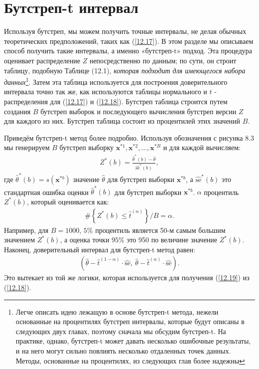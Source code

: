 \section{Бутстреп-t интервал}
Используя бутстреп, мы можем получить точные интервалы, не делая обычных теоретических предположений, таких как (\ref{12.17}). В этом разделе мы описываем способ получить такие интервалы, а именно «бутстреп-t» подход. Эта процедура оценивает распределение $Z$ непосредственно по данным; по сути, он строит таблицу, подобную Таблице (12.1), \textit{которая подходит для имеющегося набора данных}\footnote{Легче описать идею лежащую в основе бутстреп-t метода, нежели основанные на процентилях бутстреп интервалы, которые будут описаны в следующих двух главах, поэтому сначала мы обсудим бутстреп-t. На практике, однако, бутстреп-t может давать несколько ошибочные результаты, и на него могут сильно повлиять несколько отдаленных точек данных. Методы, основанные на процентилях, из следующих глав более надежны}. Затем эта таблица используется для построения доверительного интервала точно так же, как используются таблицы нормального и $t$ - распределения для (\ref{12.17}) и (\ref{12.18}). Бутстреп таблица строится путем создания $B$ бутстреп выборок и последующего вычисления бутстреп версии $Z$ для каждого из них. Бутстреп таблица состоит из процентилей этих значений $B$.

Приведём бутстреп-t метод более подробно. Используя обозначения с рисунка 8.3 мы генерируем $B$ бутстреп выборку $\textbf{x}^{*1},\textbf{x}^{*2},\ldots, \textbf{x}^{*B}$ и для каждой вычисляем:
\begin{gather}\label{12.20}
Z^{*}(b) = \frac{\widehat{\theta}^{*}(b) - \widehat{\theta}}{\widehat{\text{se}}^{*}(b)},
\end{gather}
где $\widehat{\theta}^{*}(b) = s(\textbf{x}^{*b})$ значение $\widehat{\theta}$ для бутстреп выборки $\textbf{x}^{*b}$, а $\widehat{\text{se}}^{*}(b)$ это стандартная ошибка оценки $\widehat{\theta}^{*}(b)$ для бутстреп выборки $\textbf{x}^{*b}$. $\alpha$ процентиль $Z^{*}(b)$, который оценивается как:
\begin{gather}\label{12.21}
\# \left\{Z^{*}(b)\le \widehat{t}^{(\alpha)} \right\} / B = \alpha.
\end{gather}
Например, для $B = 1000$, $5 \%$ процентиль является 50-м самым большим значением $Z^{*}(b)$, а оценка точки $95 \%$ это 950 по величине значение $Z^{*}(b)$. Наконец, доверительный интервал для бутстреп-t метод равен:
\begin{gather}\label{12.22}
( \hat{\theta} - \widehat{t}^{(1 - \alpha)} \cdot \widehat{\text{se}}, \ \widehat{\theta} - \widehat{t}^{(\alpha)} \cdot \widehat{\text{se}}).
\end{gather}
Это вытекает из той же логики, которая используется для получения (\ref{12.19}) из (\ref{12.18}).

